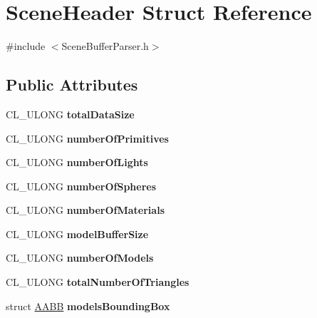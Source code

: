 \hypertarget{struct_scene_header}{}\section{Scene\+Header Struct Reference}
\label{struct_scene_header}


{\ttfamily \#include $<$Scene\+Buffer\+Parser.\+h$>$}

\subsection*{Public Attributes}
\begin{DoxyCompactItemize}
\item 
C\+L\+\_\+\+U\+L\+O\+NG {\bfseries total\+Data\+Size}\hypertarget{struct_scene_header_a60fd32c121bbb1ac75cac5f783558586}{}\label{struct_scene_header_a60fd32c121bbb1ac75cac5f783558586}

\item 
C\+L\+\_\+\+U\+L\+O\+NG {\bfseries number\+Of\+Primitives}\hypertarget{struct_scene_header_a68993e6972f7ad653fdb36b6fb3304a5}{}\label{struct_scene_header_a68993e6972f7ad653fdb36b6fb3304a5}

\item 
C\+L\+\_\+\+U\+L\+O\+NG {\bfseries number\+Of\+Lights}\hypertarget{struct_scene_header_a48f5e43d46f37a45ea17caafa0ca33d0}{}\label{struct_scene_header_a48f5e43d46f37a45ea17caafa0ca33d0}

\item 
C\+L\+\_\+\+U\+L\+O\+NG {\bfseries number\+Of\+Spheres}\hypertarget{struct_scene_header_af6009f8c2271185c62135a2293b4370a}{}\label{struct_scene_header_af6009f8c2271185c62135a2293b4370a}

\item 
C\+L\+\_\+\+U\+L\+O\+NG {\bfseries number\+Of\+Materials}\hypertarget{struct_scene_header_aa630cc77a77027d6658d107da2670b1b}{}\label{struct_scene_header_aa630cc77a77027d6658d107da2670b1b}

\item 
C\+L\+\_\+\+U\+L\+O\+NG {\bfseries model\+Buffer\+Size}\hypertarget{struct_scene_header_abae8be6cdef1572493cbde778d014289}{}\label{struct_scene_header_abae8be6cdef1572493cbde778d014289}

\item 
C\+L\+\_\+\+U\+L\+O\+NG {\bfseries number\+Of\+Models}\hypertarget{struct_scene_header_a779b057b0e9eb873069856727dc98d0b}{}\label{struct_scene_header_a779b057b0e9eb873069856727dc98d0b}

\item 
C\+L\+\_\+\+U\+L\+O\+NG {\bfseries total\+Number\+Of\+Triangles}\hypertarget{struct_scene_header_a05525cfb5dffb7c220f83d1301148a8c}{}\label{struct_scene_header_a05525cfb5dffb7c220f83d1301148a8c}

\item 
struct \hyperlink{struct_a_a_b_b}{A\+A\+BB} {\bfseries models\+Bounding\+Box}\hypertarget{struct_scene_header_af23a8ead4117e8e5e84ece1577569c2e}{}\label{struct_scene_header_af23a8ead4117e8e5e84ece1577569c2e}

\end{DoxyCompactItemize}


